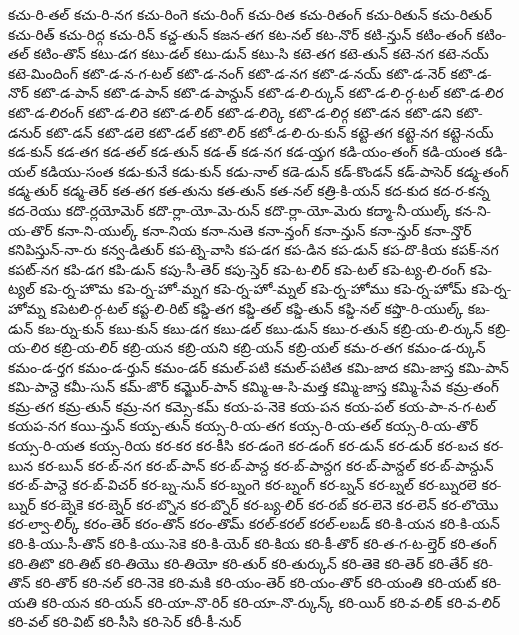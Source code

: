 {కచు-రి-తల్
కచు-రి-నగ
కచు-రింగె
కచు-రింగ్
కచు-రిత
కచు-రితంగ్
కచు-రితున్
కచు-రితుర్
కచు-రిత్
కచు-రిద్గ
కచు-రిన్
కచ్డ-తున్
కజన-తగ
కట-నల్
కట-నొర్
కటి-న్తున్
కటిం-తంగ్
కటిం-తల్
కటిం-తొన్
కటు-డగ
కటు-డల్
కటు-డున్
కటు-సి
కటె-తగ
కటె-తున్
కటె-నగ
కటె-నయ్
కటె-మిందింగ్
కటొ-డ-న-గ-టల్
కటొ-డ-నంగ్
కటొ-డ-నగ
కటొ-డ-నయ్
కటొ-డ-నెర్
కటొ-డ-నొర్
కటొ-డ-పాన్
కటొ-డ-పాన్
కటొ-డ-పాన్దున్
కటొ-డ-లి-ర్కున్
కటొ-డ-లి-ర్గ-టల్
కటొ-డ-లిర
కటొ-డ-లిరంగ్
కటొ-డ-లిరె
కటొ-డ-లిర్
కటొ-డ-లిర్కె
కటొ-డ-లిర్గ
కటొ-డన
కటొ-డని
కటొ-డనుర్
కటొ-డన్
కటొ-డలె
కటొ-డల్
కటొ-లిర్
కటో-డ-లి-రు-కున్
కట్టె-తగ
కట్టె-నగ
కట్టె-నయ్
కడ-కున్
కడ-తగ
కడ-తల్
కడ-తున్
కడ-త్
కడ-నగ
కడ-య్తగ
కడి-యం-తంగ్
కడి-యంత
కడి-యల్
కడియు-సంత
కడు-కునే
కడు-కున్
కడు-నాల్
కడె-డున్
కడ్-కొండన్
కడ్-పాసెర్
కడ్మ-తంగ్
కడ్మ-తుర్
కడ్మ-తెర్
కత-తగ
కత-తును
కత-తున్
కత-నల్
కత్రి-కి-యన్
కద-కుద
కద-ర-కన్న
కద-రెయు
కదొ-ర్లయోమెర్
కదొ-ర్లా-యో-మె-రున్
కదొ-ర్లా-యో-మెరు
కద్మా-నీ-యుల్క్
కన-ని-య-తొర్
కనా-ని-యుల్క్
కనా-నియ
కనా-నుతె
కనా-న్తంగ్
కనా-న్తున్
కనా-న్తుర్
కనా-న్తొర్
కనిపిస్తున్-నా-రు
కన్వ-డితుర్
కప-ట్నె-వాసి
కప-డగ
కప-డిన
కప-డున్
కప-దొ-కియ
కపక్-నగ
కపట్-నగ
కపి-డగ
కపి-డున్
కపు-సీ-తెర్
కపు-స్తెర్
కపె-ట-లిర్
కపె-టల్
కపె-ట్య-లి-రంగ్
కపె-ట్యల్
కపె-ర్న-హొమ
కపె-ర్న-హో-మ్నగ
కపె-ర్న-హో-మ్నల్
కపె-ర్న-హోము
కపె-ర్న-హోమ్
కపె-ర్న-హోమ్న
కపెటలి-ర్గ-టల్
కప్ట-లి-రిట్
కప్డి-తగ
కప్డి-తల్
కప్డి-తున్
కప్డి-నల్
కప్తొ-రి-యుల్క్
కబ-డున్
కబ-ర్ను-కున్
కబు-కున్
కబు-డగ
కబు-డల్
కబు-డున్
కబు-ర-తున్
కబ్రి-య-లి-ర్కున్
కబ్రి-య-లిర
కబ్రి-య-లిర్
కబ్రి-యన
కబ్రి-యని
కబ్రి-యన్
కబ్రి-యల్
కమ-ర-తగ
కమం-డ-ర్కున్
కమం-డ-ర్తగ
కమం-డ-ర్తున్
కమం-డర్
కమల్-పటి
కమల్-పటిత
కమి-జాద
కమి-జాస్త
కమి-పాన్
కమి-పాన్దె
కమీ-సున్
కమ్-జొర్
కమ్జొర్-పాన్
కమ్మి-ఆ-సి-మత్త
కమ్మి-జాస్త
కమ్మి-సేవ
కమ్ర-తంగ్
కమ్ర-తగ
కమ్ర-తున్
కమ్ర-నగ
కమ్సె-కమ్
కయ-ప-నెకె
కయ-పన
కయ-పల్
కయ-పా-న-గ-టల్
కయప-నగ
కయి-న్తున్
కయ్ప-తున్
కయ్స-రి-య-తగ
కయ్స-రి-య-తల్
కయ్స-రి-య-తొర్
కయ్స-రి-యత
కయ్స-రియ
కర-కర
కర-కీసి
కర-డంగె
కర-డంగ్
కర-డున్
కర-డుర్
కర-బచ
కర-బున
కర-బున్
కర-బ్-నగ
కర-బ్-పాన్
కర-బ్-పాన్ద
కర-బ్-పాన్దగ
కర-బ్-పాన్దల్
కర-బ్-పాన్దున్
కర-బ్-పాన్దె
కర-బ్-విచర్
కర-బ్న-నున్
కర-బ్నంగె
కర-బ్నంగ్
కర-బ్నన్
కర-బ్నల్
కర-బ్నురలె
కర-బ్నుర్
కర-బ్నెకె
కర-బ్నెర్
కర-బ్నొన
కర-బ్నొర్
కర-బ్య-లిర్
కర-రబ్
కర-లెనె
కర-లెన్
కర-లొయొ
కర-ల్వా-లిర్క్
కరం-తెర్
కరం-తొన్
కరం-తొమ్
కరల్-కరల్
కరల్-లబడ్
కరి-కి-యన
కరి-కి-యన్
కరి-కి-యు-సీ-తొన్
కరి-కి-యు-సెకె
కరి-కి-యెర్
కరి-కియ
కరి-కీ-తొర్
కరి-త-గ-ట-ల్తెర్
కరి-తంగ్
కరి-తిటొ
కరి-తిట్
కరి-తియొ
కరి-తియో
కరి-తుర్
కరి-తుర్కున్
కరి-తెకె
కరి-తెర్
కరి-తేర్
కరి-తొన్
కరి-తొర్
కరి-నల్
కరి-నెకె
కరి-మకి
కరి-యం-తెర్
కరి-యం-తొర్
కరి-యంతి
కరి-యట్
కరి-యతి
కరి-యన
కరి-యన్
కరి-యా-నొ-రిర్
కరి-యా-నొ-ర్కున్క్
కరి-యిర్
కరి-వ-లిక్
కరి-వ-లిర్
కరి-వల్
కరి-విట్
కరి-సీసి
కరి-సెర్
కరీ-కీ-నుర్
}
